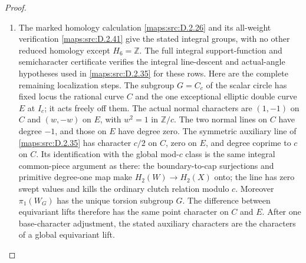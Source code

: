 \begin{proof}
\begin{enumerate}[label=\arabic*.,leftmargin=*]
\item The marked homology calculation \ref{maps:src:D.2.26} and its all-weight verification
\ref{maps:src:D.2.41} give the stated integral groups, with no other reduced homology
except $H_6=\mathbb Z$. The full integral support-function and
semicharacter certificate
verifies the integral line-descent and actual-angle hypotheses
used in \ref{maps:src:D.2.35} for these rows. Here are the complete remaining
localization steps. The subgroup $G=C_c$ of the scalar circle has
fixed locus the rational curve $C$ and the one exceptional
elliptic double curve $E$ at $I_c$; it acts freely off them.
The actual normal characters are $(1,-1)$ on $C$ and $(w,-w)$
on $E$, with $w^2=1$ in $\mathbb Z/c$. The two normal lines on
$C$ have degree $-1$, and those on $E$ have degree zero.
The symmetric auxiliary line of \ref{maps:src:D.2.35} has character $c/2$ on
$C$, zero on $E$, and degree coprime to $c$ on $C$.
Its identification with the global mod-$c$ class is the same
integral common-piece argument as there: the boundary-to-cap
surjections and primitive degree-one map make $H_2(W)\to H_2(X)$
onto; the line has zero swept values and kills the ordinary
clutch relation modulo $c$. Moreover $\pi_1(W_G)$ has the
unique torsion subgroup $G$. The difference between equivariant
lifts therefore has the same point character on $C$ and $E$.
After one base-character adjustment, the stated auxiliary
characters are the characters of a global equivariant lift.


\end{enumerate}
\end{proof}
